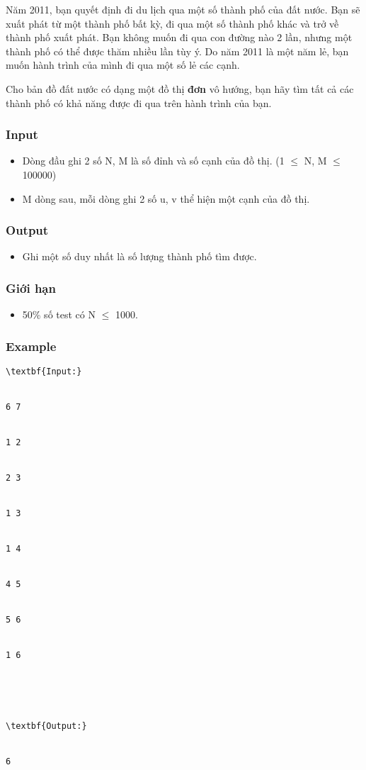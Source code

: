 



   Năm 2011, bạn quyết định đi du lịch qua một số thành phố của đất nước. Bạn sẽ xuất phát từ một thành phố bất kỳ, đi qua một số thành phố khác và trở về thành phố xuất phát. Bạn không muốn đi qua con đường nào 2 lần, nhưng một thành phố có thể được thăm nhiều lần tùy ý. Do năm 2011 là một năm lẻ, bạn muốn hành trình của mình đi qua một số lẻ các cạnh.   





   Cho bản đồ đất nước có dạng một đồ thị   \textbf{    đơn   }   vô hướng, bạn hãy tìm tất cả các thành phố có khả năng được đi qua trên hành trình của bạn.  

\subsubsection{   Input  }
\begin{itemize}
	\item     Dòng đầu ghi 2 số N, M là số đỉnh và số cạnh của đồ thị. (1  $\le$  N, M  $\le$  100000)   
\end{itemize}
\begin{itemize}
	\item     M dòng sau, mỗi dòng ghi 2 số u, v thể hiện một cạnh của đồ thị.   
\end{itemize}

\subsubsection{   Output  }
\begin{itemize}
	\item     Ghi một số duy nhất là số lượng thành phố tìm được.   
\end{itemize}

\subsubsection{   Giới hạn  }
\begin{itemize}
	\item     50\% số test có N  $\le$  1000.   
\end{itemize}

\subsubsection{   Example  }
\begin{verbatim}
\textbf{Input:}


6 7


1 2


2 3


1 3


1 4


4 5


5 6


1 6





\textbf{Output:}


6\end{verbatim}

